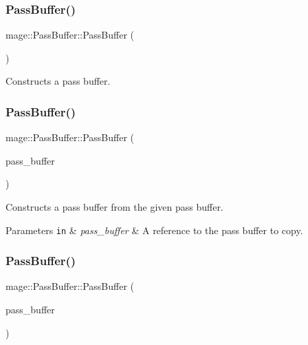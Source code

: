 \subsubsection{\texorpdfstring{Pass\+Buffer()}{PassBuffer()}\hspace{0.1cm}{\footnotesize\ttfamily [1/3]}}
{\footnotesize\ttfamily mage\+::\+Pass\+Buffer\+::\+Pass\+Buffer (\begin{DoxyParamCaption}{ }\end{DoxyParamCaption})}

Constructs a pass buffer. \hypertarget{structmage_1_1_pass_buffer_a1c6e779725227ebbb8e3d15a4515edbc}{}\label{structmage_1_1_pass_buffer_a1c6e779725227ebbb8e3d15a4515edbc} 
\subsubsection{\texorpdfstring{Pass\+Buffer()}{PassBuffer()}\hspace{0.1cm}{\footnotesize\ttfamily [2/3]}}
{\footnotesize\ttfamily mage\+::\+Pass\+Buffer\+::\+Pass\+Buffer (\begin{DoxyParamCaption}\item[{const \hyperlink{structmage_1_1_pass_buffer}{Pass\+Buffer} \&}]{pass\+\_\+buffer }\end{DoxyParamCaption})\hspace{0.3cm}{\ttfamily [default]}}

Constructs a pass buffer from the given pass buffer.


\begin{DoxyParams}[1]{Parameters}
\mbox{\tt in}  & {\em pass\+\_\+buffer} & A reference to the pass buffer to copy. \\
\hline
\end{DoxyParams}
\hypertarget{structmage_1_1_pass_buffer_a8f6baa279c6dc8c5b6869240d0169677}{}\label{structmage_1_1_pass_buffer_a8f6baa279c6dc8c5b6869240d0169677} 
\subsubsection{\texorpdfstring{Pass\+Buffer()}{PassBuffer()}\hspace{0.1cm}{\footnotesize\ttfamily [3/3]}}
{\footnotesize\ttfamily mage\+::\+Pass\+Buffer\+::\+Pass\+Buffer (\begin{DoxyParamCaption}\item[{\hyperlink{structmage_1_1_pass_buffer}{Pass\+Buffer} \&\&}]{pass\+\_\+buffer }\end{DoxyParamCaption})\hspace{0.3cm}{\ttfamily [default]}}

